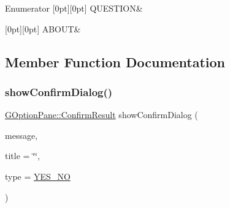 \begin{DoxyEnumFields}{Enumerator}
[0pt][0pt]{}\mbox{\label{classGOptionPane_ac6606ebe91c8ac66a2c314c79f5ab013ad126f509c35e1661274f8b72693c7848}} 
Q\+U\+E\+S\+T\+I\+ON&\\
\hline

[0pt][0pt]{}\mbox{\label{classGOptionPane_ac6606ebe91c8ac66a2c314c79f5ab013aaef4dc1e4f450a4c9e61a3699d75af0a}} 
A\+B\+O\+UT&\\
\hline

\end{DoxyEnumFields}


\subsection{Member Function Documentation}
\mbox{\label{classGOptionPane_a5aa43cc516e91b8befcd129ac11ebc96}} 
\subsubsection{\texorpdfstring{show\+Confirm\+Dialog()}{showConfirmDialog()}\hspace{0.1cm}{\footnotesize\ttfamily [1/3]}}
{\footnotesize\ttfamily \mbox{\hyperlink{classGOptionPane_a1cc9e8685029e39646671ed71f32d47d}{G\+Option\+Pane\+::\+Confirm\+Result}} show\+Confirm\+Dialog (\begin{DoxyParamCaption}\item[{const std\+::string \&}]{message,  }\item[{const std\+::string \&}]{title = {\ttfamily \char`\"{}\char`\"{}},  }\item[{\mbox{\hyperlink{classGOptionPane_a6a1aaf19c06f5a6bef89ea6415547049}{Confirm\+Type}}}]{type = {\ttfamily \mbox{\hyperlink{classGOptionPane_a6a1aaf19c06f5a6bef89ea6415547049a23d16d66a433471aa62deadacecfc08d}{Y\+E\+S\+\_\+\+NO}}} }\end{DoxyParamCaption})\hspace{0.3cm}{\ttfamily [static]}}



